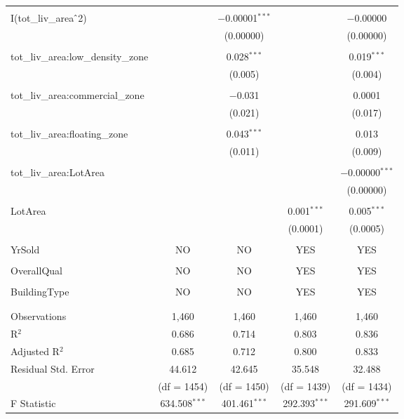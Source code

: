 \documentclass[a4paper]{article}
\begin{document}
\begin{table}[!htbp]
\begin{adjustwidth}{-0.0cm}{-0cm}
\begin{threeparttable}
\begin{tabular}{@{\extracolsep{1pt}}lcccc}
  & & & & \\ 
 I(tot\_liv\_area$\hat{\mkern6mu}$2) &  & $-$0.00001$^{***}$ &  & $-$0.00000 \\ 
  &  & (0.00000) &  & (0.00000) \\ 
  & & & & \\ 
 tot\_liv\_area:low\_density\_zone &  & 0.028$^{***}$ &  & 0.019$^{***}$ \\ 
  &  & (0.005) &  & (0.004) \\ 
  & & & & \\ 
 tot\_liv\_area:commercial\_zone &  & $-$0.031 &  & 0.0001 \\ 
  &  & (0.021) &  & (0.017) \\ 
  & & & & \\ 
 tot\_liv\_area:floating\_zone &  & 0.043$^{***}$ &  & 0.013 \\ 
  &  & (0.011) &  & (0.009) \\ 
  & & & & \\ 
 tot\_liv\_area:LotArea &  &  &  & $-$0.00000$^{***}$ \\ 
  &  &  &  & (0.00000) \\ 
  & & & & \\ 
 LotArea &  &  & 0.001$^{***}$ & 0.005$^{***}$ \\ 
  &  &  & (0.0001) & (0.0005) \\ 
  & & & & \\ 
 YrSold & NO & NO & YES & YES\\ 
  &  &  &  &  \\ 
 OverallQual & NO & NO & YES & YES\\ 
  &  &  &  &  \\ 
 BuildingType & NO & NO & YES & YES\\ 
  &  &  &  &  \\ 
\hline \\[-1.8ex] 
Observations & 1,460 & 1,460 & 1,460 & 1,460 \\ 
R$^{2}$ & 0.686 & 0.714 & 0.803 & 0.836 \\ 
Adjusted R$^{2}$ & 0.685 & 0.712 & 0.800 & 0.833 \\ 
Residual Std. Error & 44.612 & 42.645 & 35.548 & 32.488 \\ 
& (df = 1454) & (df = 1450) & (df = 1439) & (df = 1434)\\
F Statistic & 634.508$^{***}$  & 401.461$^{***}$  & 292.393$^{***}$  & 291.609$^{***}$  \\ 

\end{tabular}
\end{threeparttable}
\end{adjustwidth}
\end{table}
\end{document}
